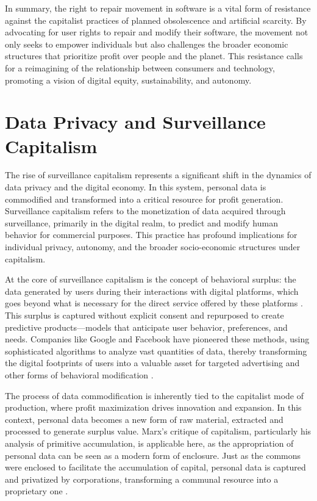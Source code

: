 \begin{refsection}
In summary, the right to repair movement in software is a vital form of resistance against the capitalist practices of planned obsolescence and artificial scarcity. By advocating for user rights to repair and modify their software, the movement not only seeks to empower individuals but also challenges the broader economic structures that prioritize profit over people and the planet. This resistance calls for a reimagining of the relationship between consumers and technology, promoting a vision of digital equity, sustainability, and autonomy.

\section{Data Privacy and Surveillance Capitalism}

The rise of surveillance capitalism represents a significant shift in the dynamics of data privacy and the digital economy. In this system, personal data is commodified and transformed into a critical resource for profit generation. Surveillance capitalism refers to the monetization of data acquired through surveillance, primarily in the digital realm, to predict and modify human behavior for commercial purposes. This practice has profound implications for individual privacy, autonomy, and the broader socio-economic structures under capitalism.

At the core of surveillance capitalism is the concept of behavioral surplus: the data generated by users during their interactions with digital platforms, which goes beyond what is necessary for the direct service offered by these platforms \cite[pp.~67-69]{zuboff2019age}. This surplus is captured without explicit consent and repurposed to create predictive products—models that anticipate user behavior, preferences, and needs. Companies like Google and Facebook have pioneered these methods, using sophisticated algorithms to analyze vast quantities of data, thereby transforming the digital footprints of users into a valuable asset for targeted advertising and other forms of behavioral modification \cite[pp.~75-78]{couldry2019data}.

The process of data commodification is inherently tied to the capitalist mode of production, where profit maximization drives innovation and expansion. In this context, personal data becomes a new form of raw material, extracted and processed to generate surplus value. Marx's critique of capitalism, particularly his analysis of primitive accumulation, is applicable here, as the appropriation of personal data can be seen as a modern form of enclosure. Just as the commons were enclosed to facilitate the accumulation of capital, personal data is captured and privatized by corporations, transforming a communal resource into a proprietary one \cite[pp.~35-38]{harvey2004new}.


\end{refsection}
